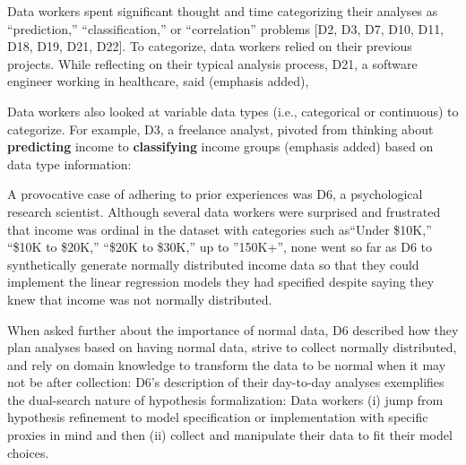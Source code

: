Data workers spent significant thought and time categorizing their analyses as
``prediction,'' ``classification,'' or ``correlation'' problems [D2, D3, D7,
D10, D11, D18, D19, D21, D22]. To categorize, data workers relied on their
previous projects. While reflecting on their typical analysis process, D21, a software engineer working in healthcare, said (emphasis added),

Data workers also looked at variable data types (i.e., categorical or continuous) to
categorize. For example, D3, a freelance analyst, pivoted from thinking about \textbf{predicting}
income to \textbf{classifying} income groups (emphasis added) based on data type
information: 

A provocative case of adhering to prior experiences was D6, a psychological research scientist. Although several
data workers were surprised and frustrated that income was ordinal in the dataset
with categories such as``Under \$10K,'' ``\$10K to \$20K,'' ``\$20K to \$30K,''
up to ''150K+'', none went so far as D6 to synthetically generate normally
distributed income data so that they could implement the linear regression
models they had specified despite saying they knew that income was not normally
distributed. 

When asked further about the importance of normal data, D6 described how they
plan analyses based on having normal data, strive to collect normally
distributed, and rely on domain knowledge to transform the data to be normal
when it may not be after collection:  D6's description of their day-to-day
analyses exemplifies the dual-search nature of hypothesis formalization: Data
workers (i) jump from hypothesis refinement to model specification or
implementation with specific proxies in mind and then (ii) collect and
manipulate their data to fit their model choices. 

